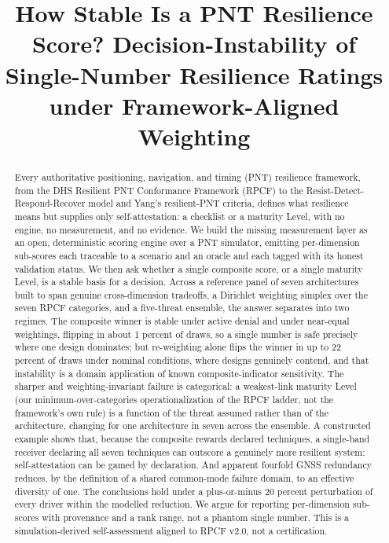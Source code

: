 \documentclass[conference]{IEEEtran}
\title{How Stable Is a PNT Resilience Score? Decision-Instability of\\ Single-Number Resilience Ratings under Framework-Aligned Weighting}
\author{\IEEEauthorblockN{Chakshu Baweja}
\IEEEauthorblockA{Ashforde O\"U\\
Tallinn, Estonia\\
contact@ashforde.org}}
\begin{document}
\maketitle

\begin{abstract}
Every authoritative positioning, navigation, and timing (PNT) resilience framework, from the DHS Resilient PNT Conformance Framework (RPCF) to the Resist-Detect-Respond-Recover model and Yang's resilient-PNT criteria, defines what resilience means but supplies only self-attestation: a checklist or a maturity Level, with no engine, no measurement, and no evidence. We build the missing measurement layer as an open, deterministic scoring engine over a PNT simulator, emitting per-dimension sub-scores each traceable to a scenario and an oracle and each tagged with its honest validation status. We then ask whether a single composite score, or a single maturity Level, is a stable basis for a decision. Across a reference panel of seven architectures built to span genuine cross-dimension tradeoffs, a Dirichlet weighting simplex over the seven RPCF categories, and a five-threat ensemble, the answer separates into two regimes. The composite winner is stable under active denial and under near-equal weightings, flipping in about 1 percent of draws, so a single number is safe precisely where one design dominates; but re-weighting alone flips the winner in up to 22 percent of draws under nominal conditions, where designs genuinely contend, and that instability is a domain application of known composite-indicator sensitivity. The sharper and weighting-invariant failure is categorical: a weakest-link maturity Level (our minimum-over-categories operationalization of the RPCF ladder, not the framework's own rule) is a function of the threat assumed rather than of the architecture, changing for one architecture in seven across the ensemble. A constructed example shows that, because the composite rewards declared techniques, a single-band receiver declaring all seven techniques can outscore a genuinely more resilient system: self-attestation can be gamed by declaration. And apparent fourfold GNSS redundancy reduces, by the definition of a shared common-mode failure domain, to an effective diversity of one. The conclusions hold under a plus-or-minus 20 percent perturbation of every driver within the modelled reduction. We argue for reporting per-dimension sub-scores with provenance and a rank range, not a phantom single number. This is a simulation-derived self-assessment aligned to RPCF v2.0, not a certification.
\end{abstract}
\end{document}

